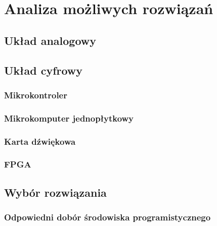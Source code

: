 \chapter{Analiza możliwych rozwiązań}
\label{cha:możliwe_układy}

\section{Układ analogowy}
\label{sec:analog}

\section{Układ cyfrowy}
\label{sec:digital}

\subsection{Mikrokontroler}
\label{uC}

\subsection{Mikrokomputer jednopłytkowy}
\label{mikrokomp}

\subsection{Karta dźwiękowa}
\label{soundcard}

\subsection{FPGA}
\label{FPGA}

\section{Wybór rozwiązania}
\label{sec:wybór}

\subsection{Odpowiedni dobór środowiska programistycznego}
\label{sec:IDE}
